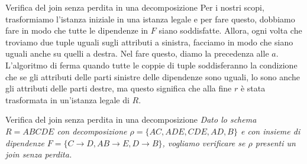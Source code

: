 \begin{Algoritmo}{Verifica del join senza perdita in una decomposizione}{}
    Per i nostri scopi, trasformiamo l'istanza iniziale in una istanza legale e per fare questo, dobbiamo fare in modo che tutte le dipendenze in $F$ siano soddisfatte. Allora, ogni volta che troviamo due tuple uguali sugli attributi a sinistra, facciamo in modo che siano uguali anche su quelli a destra. Nel fare questo, diamo la precedenza alle $a$. L'algoritmo di ferma quando tutte le coppie di tuple soddisferanno la condizione che se gli attributi delle parti sinistre delle dipendenze sono uguali, lo sono anche gli attributi delle parti destre, ma questo significa che alla fine $r$ è stata trasformata in un'istanza legale di $R$.
\end{Algoritmo}

\begin{Example}{Verifica del join senza perdita in una decomposizione}{}
    \textit{Dato lo schema $R = ABCDE$ con decomposizione $\rho = \{AC, ADE, CDE, AD, B\}$ e con insieme di dipendenze $F = \{C\to D, AB\to E, D\to B\}$, vogliamo verificare se $\rho$ presenti un join senza perdita. }
    

\end{Example}
